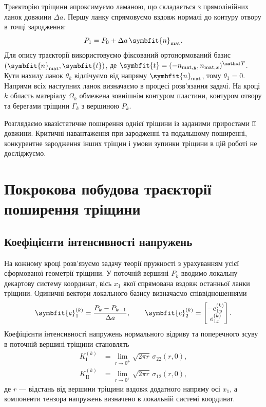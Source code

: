 \documentclass[a4paper,12pt]{article}
\newcommand{\bm}[1]{\ifstrequal{#1}{0}{\symbf{#1}}{\symbfit{#1}}}
\begin{document}
Траєкторію тріщини апроксимуємо ламаною, що складається з прямолінійних ланок довжини $\Delta a$.
Першу ланку спрямовуємо вздовж нормалі до контуру отвору в точці зародження:
\begin{equation}
 P_1=P_0+\Delta a\,\bm n_{\mathrm{mat}}.
 \label{eq:first}
\end{equation}
Для опису траєкторії використовуємо фіксований ортонормований базис $(\bm n_{\mathrm{mat}},\bm t)$,
де $\bm t=(-n_{\mathrm{mat},y},n_{\mathrm{mat},x})^{\mathsf T}$. Кути нахилу ланок $\theta_k$ відлічуємо
від напряму $\bm n_{\mathrm{mat}}$, тому $\theta_1=0$. Напрями всіх наступних ланок визначаємо
в процесі розв’язання задачі. На кроці $k$ область матеріалу $\Omega_k$ обмежена зовнішнім контуром
пластини, контуром отвору та берегами тріщини $\Gamma_k$ з вершиною $P_k$.

Розглядаємо квазістатичне поширення однієї тріщини із заданими приростами її довжини.
Критичні навантаження при зародженні та подальшому поширенні, конкурентне зародження інших тріщин
і умови зупинки тріщини в цій роботі не досліджуємо.

\section{Покрокова побудова траєкторії поширення тріщини}
\label{sec:recurrence}
\subsection{Коефіцієнти інтенсивності напружень}
На кожному кроці розв’язуємо задачу теорії пружності з урахуванням усієї сформованої геометрії тріщини.
У поточній вершині $P_k$ вводимо локальну декартову систему координат, вісь $x_1$ якої спрямована
вздовж останньої ланки тріщини. Одиничні вектори локального базису визначаємо співвідношеннями
\[
 \bm e_1^{(k)}=\frac{P_k-P_{k-1}}{\Delta a},
 \qquad
 \bm e_2^{(k)}=\begin{bmatrix}-e_{1y}^{(k)}\\e_{1x}^{(k)}\end{bmatrix}.
\]
Коефіцієнти інтенсивності напружень нормального відриву та поперечного зсуву в поточній вершині тріщини становлять
\begin{equation}
 \begin{aligned}
 K_{\mathrm I}^{(k)}&=\lim_{r\to0^+}\sqrt{2\pi r}\,\sigma_{22}(r,0),\\
 K_{\mathrm{II}}^{(k)}&=\lim_{r\to0^+}\sqrt{2\pi r}\,\sigma_{12}(r,0),
 \end{aligned}
 \label{eq:sifdefinition}
\end{equation}
де $r$ --- відстань від вершини тріщини вздовж додатного напряму осі $x_1$,
а компоненти тензора напружень визначено в локальній системі координат.
\end{document}
